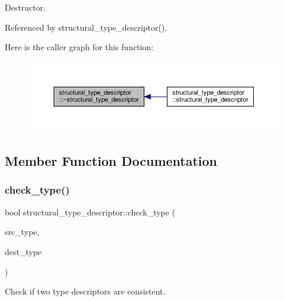 Destructor. 



Referenced by structural\+\_\+type\+\_\+descriptor().

Here is the caller graph for this function\+:
\nopagebreak
\begin{figure}[H]
\begin{center}
\leavevmode
\includegraphics[width=350pt]{dc/da4/structstructural__type__descriptor_a94a522503d02e9da39327fdf09a43a17_icgraph}
\end{center}
\end{figure}


\subsection{Member Function Documentation}
\mbox{\label{structstructural__type__descriptor_a526678aa02ed449cfc5a2a6268de0963}} 
\subsubsection{\texorpdfstring{check\+\_\+type()}{check\_type()}}
{\footnotesize\ttfamily bool structural\+\_\+type\+\_\+descriptor\+::check\+\_\+type (\begin{DoxyParamCaption}\item[{\hyperlink{structural__objects_8hpp_a219296792577e3292783725961506c83}{structural\+\_\+type\+\_\+descriptor\+Ref}}]{src\+\_\+type,  }\item[{\hyperlink{structural__objects_8hpp_a219296792577e3292783725961506c83}{structural\+\_\+type\+\_\+descriptor\+Ref}}]{dest\+\_\+type }\end{DoxyParamCaption})\hspace{0.3cm}{\ttfamily [static]}}



Check if two type descriptors are consistent. 


